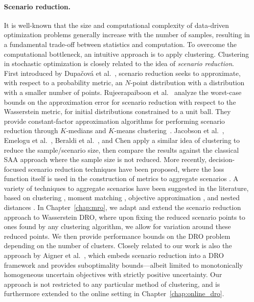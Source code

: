 \paragraph{Scenario reduction.}
It is well-known that the size and computational complexity of data-driven optimization problems generally increase with the number of samples, resulting in a fundamental trade-off between statistics and computation. To overcome the computational bottleneck, an intuitive approach is to apply clustering.  
Clustering in stochastic optimization is closely related to the idea of {\it scenario reduction}.
First introduced by Dupa{\v c}ov{\'a} et al.~\cite{dupavcova2003scenario}, scenario reduction seeks to approximate, with respect to a probability metric, an $N$-point distribution with a distribution with a smaller number of points.
Rujeerapaiboon et al.~\cite{scen_k} analyze the worst-case bounds on the approximation error for scenario reduction with respect to the Wasserstein metric, for initial distributions constrained to a unit ball.
They provide constant-factor approximation algorithms for performing scenario reduction through $K$-medians and $K$-means clustering~\citep{kmeans}.
Jacobson et al.~\citep{SAA1}, Emelogu et al.~\cite{SAA2}, Beraldi et al.~\cite{SAA3}, and Chen \cite{SAA4} apply a similar idea of clustering to reduce the sample/scenario size, then compare the results against the classical \gls{SAA} approach where the sample size is not reduced.
More recently, decision-focused scenario reduction techniques have been proposed, where the loss function itself is used in the construction of metrics to aggregate scenarios \cite{bertsimas2023optimization, zhang2023optimized}. A variety of techniques to aggregate scenarios have been suggested in the literature, based on clustering \cite{hewitt2022decision}, moment matching \cite{mehrotra2013generating}, objective approximation \cite{zenios1993constructing}, and nested distances \cite{horejvsova2020evaluation}.
In Chapter~\ref{chap:mro}, we adapt and extend the scenario reduction approach to Wasserstein \gls{DRO}, where upon fixing the reduced scenario points to ones found by any clustering algorithm, we allow for variation around these reduced points.
We then provide performance bounds on the \gls{DRO} problem depending on the number of clusters.
Closely related to our work is also the approach by Aigner et al.~\cite{aigner2025scenario}, which embeds scenario reduction into a \gls{DRO} framework and provides suboptimality bounds---albeit limited to monotonically homogeneous uncertain objectives with strictly positive uncertainty.
Our approach is not restricted to any particular method of clustering, and is furthermore extended to the online setting in Chapter~\ref{chap:online_dro}.

